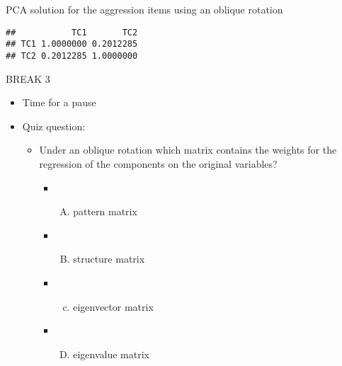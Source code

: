 \documentclass[
  ignorenonframetext,
]{beamer}
\newenvironment{Shaded}{\begin{snugshade}}{\end{snugshade}}
\newcommand{\DataTypeTok}[1]{\textcolor[rgb]{0.13,0.29,0.53}{#1}}
\newcommand{\DecValTok}[1]{\textcolor[rgb]{0.00,0.00,0.81}{#1}}
\newcommand{\KeywordTok}[1]{\textcolor[rgb]{0.13,0.29,0.53}{\textbf{#1}}}
\newcommand{\NormalTok}[1]{#1}
\newcommand{\OperatorTok}[1]{\textcolor[rgb]{0.81,0.36,0.00}{\textbf{#1}}}
\newcommand{\StringTok}[1]{\textcolor[rgb]{0.31,0.60,0.02}{#1}}
\providecommand{\tightlist}{%
  \setlength{\itemsep}{0pt}\setlength{\parskip}{0pt}}
\begin{document}
\begin{frame}[fragile]{PCA solution for the aggression items using an
oblique rotation}
\protect\hypertarget{pca-solution-for-the-aggression-items-using-an-oblique-rotation-1}{}

\begin{Shaded}
\end{Shaded}

\begin{verbatim}
##           TC1       TC2
## TC1 1.0000000 0.2012285
## TC2 0.2012285 1.0000000
\end{verbatim}

\end{frame}

\begin{frame}{BREAK 3}
\protect\hypertarget{break-3}{}

\begin{itemize}
\tightlist
\item
  Time for a pause
\item
  Quiz question:

  \begin{itemize}
  \tightlist
  \item
    Under an oblique rotation which matrix contains the weights for the
    regression of the components on the original variables?

    \begin{itemize}
    \item
      \begin{enumerate}
      [A)]
      \tightlist
      \item
        pattern matrix
      \end{enumerate}
    \item
      \begin{enumerate}
      [A)]
      \setcounter{enumi}{1}
      \tightlist
      \item
        structure matrix
      \end{enumerate}
    \item
      \begin{enumerate}
      [a)]
      \setcounter{enumi}{2}
      \tightlist
      \item
        eigenvector matrix
      \end{enumerate}
    \item
      \begin{enumerate}
      [A)]
      \setcounter{enumi}{3}
      \tightlist
      \item
        eigenvalue matrix
      \end{enumerate}
    \end{itemize}
  \end{itemize}
\end{itemize}

\end{frame}
\end{document}
